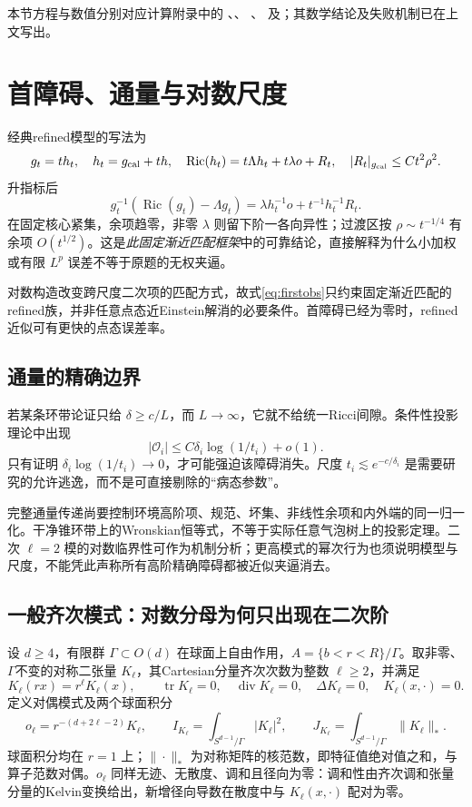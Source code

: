 \documentclass[UTF8,a4paper,11pt,fontset=fandol]{ctexart}
\numberwithin{equation}{section}
\theoremstyle{definition}
\newcommand{\Ric}{\operatorname{Ric}}
\newcommand{\tr}{\operatorname{tr}}
\begin{document}
本节方程与数值分别对应计算附录中的
、、
、
及；其数学结论及失败机制已在上文写出。

\section{首障碍、通量与对数尺度}
经典refined模型的写法为
\[
g_t=t h_t,\quad h_t=g_{\rm cal}+th,\quad
\Ric(h_t)=t\Lambda h_t+t\lambda o+R_t,
\quad |R_t|_{g_{\rm cal}}\le Ct^2\rho^2.
\]
升指标后
\begin{equation}\label{eq:firstobs}
g_t^{-1}(\Ric(g_t)-\Lambda g_t)
=\lambda h_t^{-1}o+t^{-1}h_t^{-1}R_t.
\end{equation}
在固定核心紧集，余项趋零，非零 $\lambda$ 则留下阶一各向异性；过渡区按 $\rho\sim t^{-1/4}$ 有余项 $O(t^{1/2})$。这是\emph{此固定渐近匹配框架}中的可靠结论，直接解释为什么小加权或有限 $L^p$ 误差不等于原题的无权夹逼\cite{MV,Biquard}。

对数构造改变跨尺度二次项的匹配方式，故式\eqref{eq:firstobs}只约束固定渐近匹配的refined族，并非任意点态近Einstein解消的必要条件。首障碍已经为零时，refined近似可有更快的点态误差率。

\subsection{通量的精确边界}
若某条环带论证只给 $\delta\ge c/L$，而 $L\to\infty$，它就不给统一Ricci间隙。条件性投影理论中出现
\[
|\mathcal O_i|\le C\delta_i\log(1/t_i)+o(1).
\]
只有证明 $\delta_i\log(1/t_i)\to0$，才可能强迫该障碍消失。尺度 $t_i\lesssim e^{-c/\delta_i}$ 是需要研究的允许逃逸，而不是可直接剔除的“病态参数”。

完整通量传递尚要控制环境高阶项、规范、坏集、非线性余项和内外端的同一归一化。干净锥环带上的Wronskian恒等式，不等于实际任意气泡树上的投影定理。二次 $\ell=2$ 模的对数临界性可作为机制分析；更高模式的幂次行为也须说明模型与尺度，不能凭此声称所有高阶精确障碍都被近似夹逼消去。

\subsection{一般齐次模式：对数分母为何只出现在二次阶}\label{sec:ellflux}
设 $d\ge4$，有限群 $\Gamma\subset O(d)$ 在球面上自由作用，$A=\{b<r<R\}/\Gamma$。取非零、$\Gamma$不变的对称二张量 $K_\ell$，其Cartesian分量齐次次数为整数 $\ell\ge2$，并满足
\[
K_\ell(rx)=r^\ell K_\ell(x),\qquad
\tr K_\ell=0,\quad\operatorname{div}K_\ell=0,\quad
\Delta K_\ell=0,\quad K_\ell(x,\cdot)=0.
\]
定义对偶模式及两个球面积分
\[
o_\ell=r^{-(d+2\ell-2)}K_\ell,\qquad
I_{K_\ell}=\int_{S^{d-1}/\Gamma}|K_\ell|^2,\qquad
J_{K_\ell}=\int_{S^{d-1}/\Gamma}\|K_\ell\|_*.
\]
球面积分均在 $r=1$ 上；$\|\cdot\|_*$ 为对称矩阵的核范数，即特征值绝对值之和，与算子范数对偶。$o_\ell$ 同样无迹、无散度、调和且径向为零：调和性由齐次调和张量分量的Kelvin变换给出，新增径向导数在散度中与 $K_\ell(x,\cdot)$ 配对为零。
\end{document}
